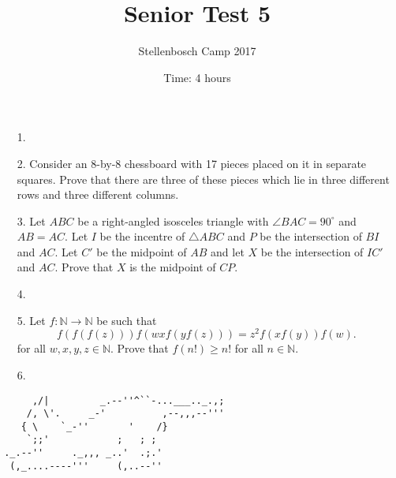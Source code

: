 \documentclass[12pt]{article}
\title{Senior Test 5}
\author{Stellenbosch Camp 2017}
\date{Time: 4 hours}
\begin{document}
 \maketitle

\begin{enumerate}

\item[1.] %


\item[2.] %
Consider an 8-by-8 chessboard with 17 pieces placed on it in separate squares. Prove that there are three of these pieces which lie in three different rows and three different columns.


\item[3.] %
Let $ABC$ be a right-angled isosceles triangle with $\angle BAC = 90^\circ$ and $AB = AC$. Let $I$ be the incentre of $\triangle ABC$ and $P$ be the intersection of $BI$ and $AC$. Let $C'$ be the midpoint of $AB$ and let $X$ be the intersection of $IC'$ and $AC$. Prove that $X$ is the midpoint of $CP$.


\item[4.] %
 

\item[5.] %
Let $f : \mathbb{N} \to \mathbb{N}$ be such that
  \[ f(f(f(z))) f(wx f(y f(z))) = z^2 f(xf(y)) f(w) .\]
for all $w, x, y, z \in \mathbb{N}$. Prove that $f(n!) \geq n!$ for all $n \in \mathbb{N}$.


\item[6.] %


\end{enumerate}

\vfill

\centering
\begin{BVerbatim}
      ,/|         _.--''^``-...___.._.,;
     /, \'.     _-'          ,--,,,--'''
    { \    `_-''       '    /}
     `;;'            ;   ; ;
 ._.--''     ._,,, _..'  .;.'
  (,_....----'''     (,..--''
\end{BVerbatim}
\end{document}
